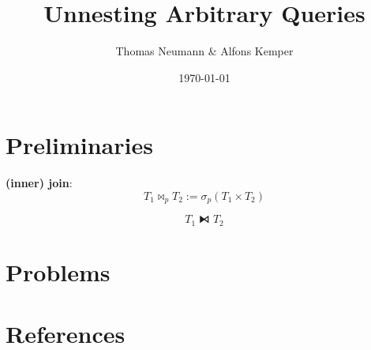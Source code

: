 \documentclass[11pt]{article}
\author{Thomas Neumann \& Alfons Kemper}
\date{\today}
\title{Unnesting Arbitrary Queries}
\begin{document}
\maketitle
\section{Preliminaries}
\label{sec:org28099b5}
\textbf{(inner) join}:
\begin{equation*}
T_1\bowtie_p T_2:=\sigma_p(T_1\times T_2)
\end{equation*}

\begin{equation*}
T_1\lfbowtie T_2
\end{equation*}
\section{Problems}
\label{sec:org732d9a2}


\section{References}
\label{sec:orgfed7e98}
\label{bibliographystyle link}


\label{bibliography link}

\end{document}
